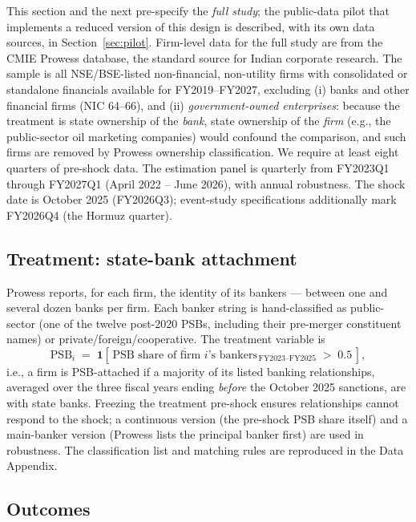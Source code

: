 \documentclass[12pt]{article}
\begin{document}
This section and the next pre-specify the \emph{full study}; the public-data pilot that
implements a reduced version of this design is described, with its own data sources, in
Section~\ref{sec:pilot}. Firm-level data for the full study are from the CMIE Prowess
database, the standard source for Indian corporate research. The sample is all NSE/BSE-listed non-financial, non-utility firms with
consolidated or standalone financials available for FY2019--FY2027, excluding (i) banks and
other financial firms (NIC 64--66), and (ii) \emph{government-owned enterprises}: because
the treatment is state ownership of the \emph{bank}, state ownership of the \emph{firm}
(e.g., the public-sector oil marketing companies) would confound the comparison, and such
firms are removed by Prowess ownership classification. We require at least eight quarters
of pre-shock data. The estimation panel is quarterly from FY2023Q1 through FY2027Q1
(April 2022 -- June 2026), with annual robustness. The shock date is October 2025
(FY2026Q3); event-study specifications additionally mark FY2026Q4 (the Hormuz quarter).

\subsection{Treatment: state-bank attachment}

Prowess reports, for each firm, the identity of its bankers --- between one and several
dozen banks per firm. Each banker string is hand-classified as public-sector (one of the
twelve post-2020 PSBs, including their pre-merger constituent names) or
private/foreign/cooperative. The treatment variable is
\begin{equation}
\text{PSB}_i \;=\; \mathbf{1}\!\left[\,\overline{\text{PSB share of firm $i$'s bankers}}
_{\,\text{FY2023--FY2025}} \;>\; 0.5\,\right],
\label{eq:treatment}
\end{equation}
i.e., a firm is PSB-attached if a majority of its listed banking relationships, averaged
over the three fiscal years ending \emph{before} the October 2025 sanctions, are with state
banks. Freezing the treatment pre-shock ensures relationships cannot respond to the shock;
a continuous version (the pre-shock PSB share itself) and a main-banker version (Prowess
lists the principal banker first) are used in robustness. The classification list and
matching rules are reproduced in the Data Appendix.

\subsection{Outcomes}
\end{document}
